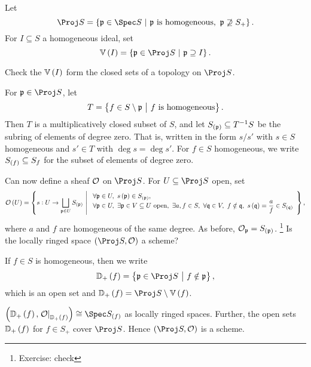 \begin{definition*}
Let
$$ \Proj S = \cbr{\ppp \in \Spec S \st \ppp \ \text{is homogeneous}, \ \ppp \not\supseteq S_+}. $$
For $ I \subseteq S $ a homogeneous ideal, set
$$ \VV\br{I} = \cbr{\ppp \in \Proj S \st \ppp \supseteq I}. $$
\end{definition*}

\begin{exercise*}
Check the $ \VV\br{I} $ form the closed sets of a topology on $ \Proj S $.
\end{exercise*}

\pagebreak


\begin{notation*}
For $ \ppp \in \Proj S $, let
$$ T = \cbr{f \in S \setminus \ppp \st f \ \text{is homogeneous}}. $$
Then $ T $ is a multiplicatively closed subset of $ S $, and let $ S_{\br{\ppp}} \subseteq T^{-1}S $ be the subring of elements of degree zero. That is, written in the form $ s / s' $ with $ s \in S $ homogeneous and $ s' \in T $ with $ \deg s = \deg s' $. For $ f \in S $ homogeneous, we write $ S_{\br{f}} \subseteq S_f $ for the subset of elements of degree zero.
\end{notation*}

Can now define a sheaf $ \mathcal{O} $ on $ \Proj S $. For $ U \subseteq \Proj S $ open, set
$$ \OOO\br{U} = \cbr{s : U \to \bigsqcup_{\ppp \in U} S_{\br{\ppp}} \st \begin{array}{l} \forall \ppp \in U, \ s\br{\ppp} \in S_{\br{\ppp}}, \\ \forall \ppp \in U, \ \exists \ppp \in V \subseteq U \ \text{open}, \ \exists a, f \in S, \ \forall \qqq \in V, \ f \notin \qqq, \ s\br{\qqq} = \dfrac{a}{f} \in S_{\br{\qqq}} \end{array}}, $$
where $ a $ and $ f $ are homogeneous of the same degree. As before, $ \OOO_\ppp = S_{\br{\ppp}} $. \footnote{Exercise: check} Is the locally ringed space $ \br{\Proj S, \OOO} $ a scheme?

\begin{notation*}
If $ f \in S $ is homogeneous, then we write
$$ \DD_+\br{f} = \cbr{\ppp \in \Proj S \st f \notin \ppp}, $$
which is an open set and $ \DD_+\br{f} = \Proj S \setminus \VV\br{f} $.
\end{notation*}

\begin{proposition}
$ \br{\DD_+\br{f}, \eval{\OOO}_{\DD_+\br{f}}} \cong \Spec S_{\br{f}} $ as locally ringed spaces. Further, the open sets $ \DD_+\br{f} $ for $ f \in S_+ $ cover $ \Proj S $. Hence $ \br{\Proj S, \OOO} $ is a scheme.
\end{proposition}


